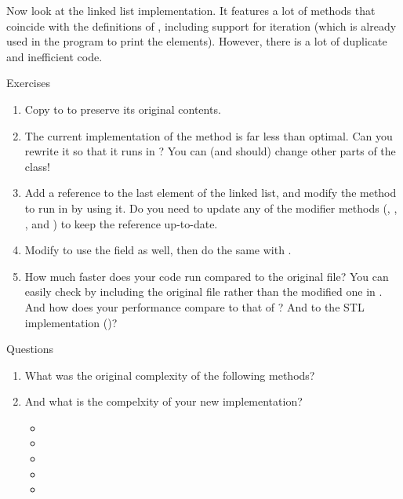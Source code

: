 Now look at the linked list implementation. It features a lot of methods that coincide with the definitions of , including support for iteration (which is already used in the program to print the elements). However, there is a lot of duplicate and inefficient code.
%
\begin{mybox}{Exercises}
    \begin{enumerate}
        \item Copy  to  to preserve its original contents.
        \item The current implementation of the  method is far less than optimal. Can you rewrite it so that it runs in ? You can (and should) change other parts of the class!
        \item Add a reference to the last element of the linked list, and modify the  method to run in  by using it. Do you need to update any of the modifier methods (, , , and ) to keep the reference up-to-date.
        \item Modify  to use the field as well, then do the same with .
        \item How much faster does your code run compared to the original file? You can easily check by including the original file rather than the modified one in . And how does your performance compare to that of ? And to the STL implementation ()?
    \end{enumerate}
\end{mybox}
%
\begin{mybox}{Questions}
    \begin{enumerate}
        \item What was the original complexity of the following methods?
        \item And what is the compelxity of your new implementation?
        \begin{itemize}
            \item {}
            \item {}
            \item {}
            \item {}
            \item {}
        \end{itemize}
    \end{enumerate}
\end{mybox}

